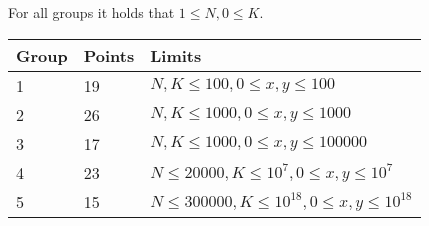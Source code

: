 For all groups it holds that $1 \le N, 0 \le K$.

\begin{tabular}{| l | l | l |}
	\hline
	Group & Points & Limits\\ \hline
	1 & 19 & $N, K \le 100, 0 \le x, y \le 100$ \\ \hline
	2 & 26 & $N, K \le 1000, 0 \le x, y \le 1000$ \\ \hline
	3 & 17 & $N, K \le 1000, 0 \le x, y \le 100000$ \\ \hline
	4 & 23 & $N \le 20000, K \le 10^7, 0 \le x, y \le 10^7$ \\ \hline
	5 & 15 & $N \le 300000, K \le 10^{18}, 0 \le x, y \le 10^{18}$ \\ \hline
\end{tabular}

